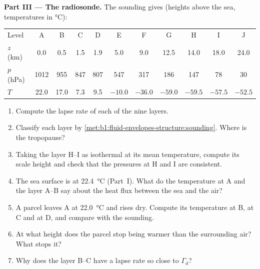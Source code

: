 \begin{problem}
\medskip
\noindent\textbf{Part III --- The radiosonde.} The sounding gives (heights above
the sea, temperatures in \si{\celsius}):
\begin{center}
\small
\setlength{\tabcolsep}{4pt}
\begin{tabular}{|l|cccccccccc|}
\hline
Level & A & B & C & D & E & F & G & H & I & J \\
$z$ (km) & 0.0 & 0.5 & 1.5 & 1.9 & 5.0 & 9.0 & 12.5 & 14.0 & 18.0 & 24.0 \\
$p$ (hPa) & 1012 & 955 & 847 & 807 & 547 & 317 & 186 & 147 & 78 & 30 \\
$T$ & 22.0 & 17.0 & 7.3 & 9.5 & $-10.0$ & $-36.0$ & $-59.0$ & $-59.5$ & $-57.5$ & $-52.5$ \\
\hline
\end{tabular}
\end{center}
\begin{enumerate}[resume]
  \item Compute the lapse rate of each of the nine layers.
  \item Classify each layer by \cref{met:b1:fluid-envelopes-structure:sounding}.
        Where is the tropopause?
  \item Taking the layer H--I as isothermal at its mean temperature, compute its
        scale height and check that the pressures at H and I are consistent.
  \item The sea surface is at \qty{22.4}{\celsius} (Part~I). What do the
        temperature at A and the layer A--B say about the heat flux between the
        sea and the air?
  \item A parcel leaves A at \qty{22.0}{\celsius} and rises dry. Compute its
        temperature at B, at C and at D, and compare with the sounding.
  \item At what height does the parcel stop being warmer than the surrounding air?
        What stops it?
  \item Why does the layer B--C have a lapse rate so close to $\Gamma_d$?
\end{enumerate}


\end{problem}

